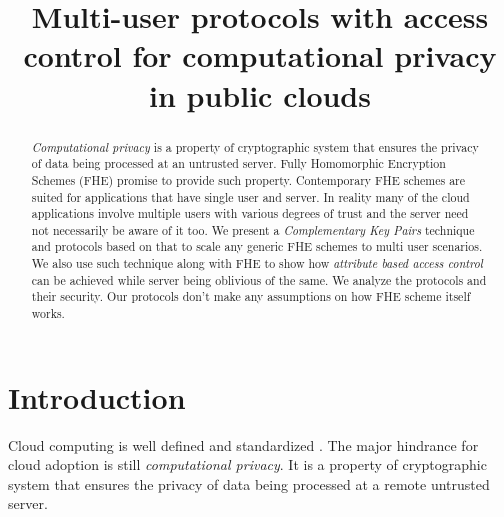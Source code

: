 \documentclass[conference]{IEEEtran}
\numberwithin{equation}{section}
\begin{document}
\title {Multi-user protocols with access control for computational privacy in public clouds}


\author{
}













\maketitle


\begin{abstract}
\emph{Computational privacy} is a property of cryptographic system that ensures the privacy of data being processed at an untrusted server. Fully Homomorphic Encryption Schemes (FHE) promise to provide such property. Contemporary FHE schemes are suited for applications that have single user and server. In reality many of the cloud applications involve multiple users with various degrees of trust and the server need not necessarily be aware of it too.
We present a \emph{Complementary Key Pairs} technique and protocols based on that to scale any generic FHE schemes to multi user scenarios. We also use such technique along with FHE to show how \emph{attribute based access control} can be achieved while server being oblivious of the same. We analyze the protocols and their security. Our protocols don't make any assumptions on how FHE scheme itself works.
\end{abstract}







\IEEEpeerreviewmaketitle

\section{Introduction}
Cloud computing is well defined and standardized \cite {mell2011nist}. The major hindrance for cloud adoption is still  \emph{computational privacy}. It is a property of cryptographic system that ensures the privacy of data being processed at a remote untrusted server.
 
\end{document}
